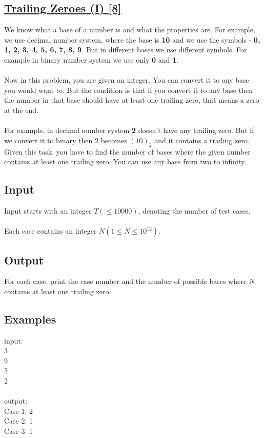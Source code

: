 \documentclass[10pt,a4paper]{article}
\begin{document}
\begin{itemize}
\subsection*{\href{https://lightoj.com/problem/trailing-zeroes-i}{\underline{Trailing Zeroes (I) [8]}}}
We know what a base of a number is and what the properties are. For example, we use decimal number system, where the base is \textbf{10} and we use the symbols - \textbf{{0, 1, 2, 3, 4, 5, 6, 7, 8, 9}}. But in different bases we use different symbols. For example in binary number system we use only \textbf{0} and \textbf{1}.
\\ \\
Now in this problem, you are given an integer. You can convert it to any base you would want to. But the condition is that if you convert it to any base then the number in that base should have at least one trailing zero, that means a zero at the end.
\\ \\
For example, in decimal number system \textbf{2} doesn't have any trailing zero. But if we convert it to binary then 2 becomes $(10)_2$ and it contains a trailing zero. Given this task, you have to find the number of bases where the given number contains at least one trailing zero. You can use any base from two to infinity.

\subsection*{Input}
Input starts with an integer $T (\leq 10000)$, denoting the number of test cases.
\\ \\
Each case contains an integer $N (1 \leq N \leq 10^{12})$.
\subsection*{Output}
For each case, print the case number and the number of possible bases where $N$ contains at least one trailing zero.
\subsection*{Examples}
input: \\
3 \\
9 \\
5 \\
2 \\
\\
output: \\
Case 1: 2 \\
Case 2: 1 \\
Case 3: 1 

\end{itemize}
\end{document}
